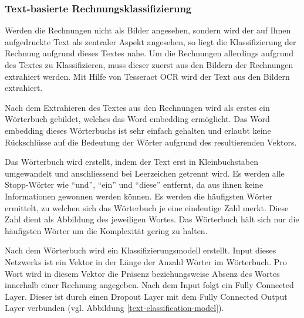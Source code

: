 \subsubsection{Text-basierte Rechnungsklassifizierung}
\label{chap:text-based-classification}


Werden die Rechnungen nicht als Bilder angesehen, sondern wird der auf Ihnen aufgedruckte Text als zentraler Aspekt angesehen, so liegt die Klassifizierung der Rechnung aufgrund dieses Textes nahe. Um die Rechnungen allerdings aufgrund des Textes zu Klassifizieren, muss dieser zuerst aus den Bildern der Rechnungen extrahiert werden. Mit Hilfe von Tesseract OCR wird der Text aus den Bildern extrahiert.

Nach dem Extrahieren des Textes aus den Rechnungen wird als erstes ein Wörterbuch gebildet, welches das Word embedding ermöglicht. Das Word embedding dieses Wörterbuchs ist sehr einfach gehalten und erlaubt keine Rückschlüsse auf die Bedeutung der Wörter aufgrund des resultierenden Vektors.

Das Wörterbuch wird erstellt, indem der Text erst in Kleinbuchstaben umgewandelt und anschliessend bei Leerzeichen getrennt wird. Es werden alle Stopp-Wörter wie \enquote{und}, \enquote{ein} und \enquote{diese} entfernt, da aus ihnen keine Informationen gewonnen werden können. Es werden die häufigsten Wörter ermittelt, zu welchen sich das Wörterbuch je eine eindeutige Zahl merkt. Diese Zahl dient als Abbildung des jeweiligen Wortes. Das Wörterbuch hält sich nur die häufigsten Wörter um die Komplexität gering zu halten.

Nach dem Wörterbuch wird ein Klassifizierungsmodell erstellt. Input dieses Netzwerks ist ein Vektor in der Länge der Anzahl Wörter im Wörterbuch. Pro Wort wird in diesem Vektor die Präsenz beziehungsweise Absenz des Wortes innerhalb einer Rechnung angegeben. Nach dem Input folgt ein Fully Connected Layer. Dieser ist durch einen Dropout Layer mit dem Fully Connected Output Layer verbunden (vgl. Abbildung \ref{text-classification-model}). 


